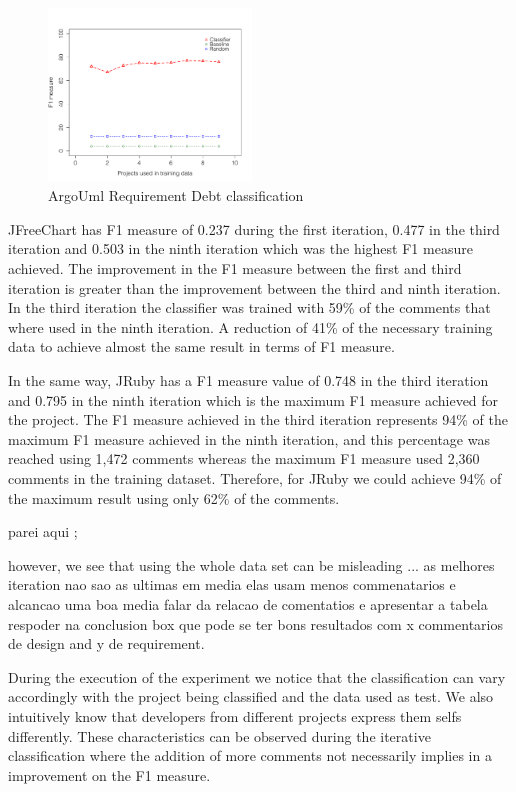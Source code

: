\begin{figure}[thb!]
  \centering
  \includegraphics[width=0.48\textwidth]{figures/implementation_argo.pdf}
  \vspace{-3mm}
  \caption{ArgoUml Requirement Debt classification}
  \label{fig:implementation_argo_result}
\end{figure}

JFreeChart has F1 measure of 0.237 during the first iteration, 0.477 in the third iteration and 0.503 in the ninth iteration which was the highest F1 measure achieved. The improvement in the F1 measure between the first and third iteration is greater than the improvement between the third and ninth iteration. In the third iteration the classifier was trained with 59\% of the comments that where used in the ninth iteration. A reduction of 41\% of the necessary training data to achieve almost the same result in terms of F1 measure. 


In the same way, JRuby has a F1 measure value of 0.748 in the third iteration and 0.795 in the ninth iteration which is the maximum F1 measure achieved for the project. The F1 measure achieved in the third iteration represents 94\% of the maximum F1 measure achieved in the ninth iteration, and this percentage was reached using 1,472 comments whereas the maximum F1 measure used 2,360 comments in the training dataset. Therefore, for JRuby we could achieve 94\% of the maximum result using only 62\% of the comments.

parei aqui ; 

however, we see that using the whole data set can be misleading ... 
as melhores iteration nao sao as ultimas 
em media elas usam menos commenatarios e alcancao uma boa media 
falar da relacao de comentatios e apresentar a tabela 
respoder na conclusion box que pode se ter bons resultados com x commentarios de design and y de requirement. 

During the execution of the experiment we notice that the classification can vary accordingly with the project being classified and the data used as test. We also intuitively know that developers from different projects express them selfs differently. These characteristics can be observed during the iterative classification where the addition of more comments not necessarily implies in a improvement on the F1 measure.

